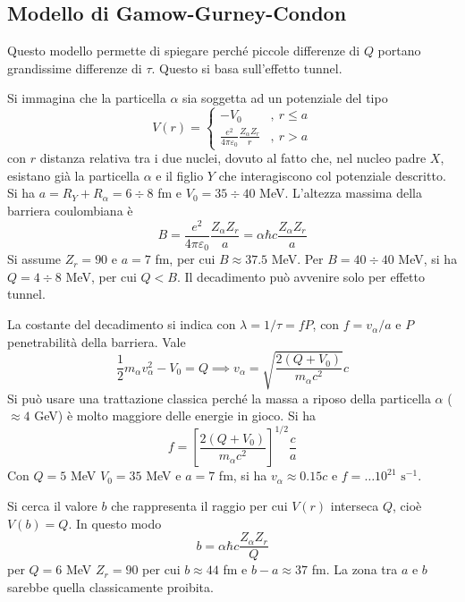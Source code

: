 \documentclass[11pt, a4paper]{scrartcl}
\theoremstyle{style}
\numberwithin{equation}{subsection}
\begin{document}
\subsection{Modello di Gamow-Gurney-Condon}
Questo modello permette di spiegare perch\'e piccole differenze di $Q$ portano grandissime differenze di $\tau $.
Questo si basa sull'effetto tunnel.

Si immagina che la particella $\alpha $ sia soggetta ad un potenziale del tipo 
\[
V(r) = \begin{cases}
	-V_0 &,\ r\le a\\
	\frac{e^2 }{4\pi \varepsilon _0} \frac{Z_\alpha Z_r}{r} &,\ r> a
\end{cases}
\] 
con $r$ distanza relativa tra i due nuclei, dovuto al fatto che, nel nucleo padre $X$, esistano gi\`a la particella $\alpha $ e il figlio $Y$ che interagiscono col potenziale descritto.
Si ha $a = R_Y + R_\alpha  = 6\div 8$ fm e $V_0 = 35\div 40$ MeV.
L'altezza massima della barriera coulombiana \`e 
\[
B = \frac{e^2}{4\pi \varepsilon _0} \frac{Z_\alpha  Z_r}{a} = \alpha \hbar c \frac{Z_\alpha Z_r}{a}
\] 
Si assume $Z_r = 90$ e $a = 7$ fm, per cui $B \approx 37.5$ MeV.
Per $B = 40 \div 40$ MeV, si ha $Q = 4 \div 8$ MeV, per cui $Q < B$.
Il decadimento pu\`o avvenire solo per effetto tunnel.

La costante del decadimento si indica con $\lambda  = 1 / \tau  = f P$, con $f = v_ \alpha  / a$ e $P$ penetrabilit\`a della barriera. 
Vale 
\[
\frac{1}{2} m_\alpha  v_\alpha ^2 - V_0 = Q \implies v_\alpha = \sqrt{\frac{2 (Q+V_0)}{m_\alpha c^2}} c
\] 
Si pu\`o usare una trattazione classica perch\'e la massa a riposo della particella $\alpha $ ($\approx 4$ GeV) \`e molto maggiore delle energie in gioco.
Si ha 
\[
f = \left[ \frac{2 (Q+V_0)}{m_\alpha c^2} \right] ^{1 / 2} \frac{c}{a}
\] 
Con $Q = 5$ MeV $V_0 = 35$ MeV e $a= 7$ fm, si ha $v_ \alpha  \approx 0.15 c$ e $f = \ldots 10^{21} \text{ s}^{-1}$.

Si cerca il valore $b$ che rappresenta il raggio per cui $V(r)$ interseca $Q$, cio\`e $V(b) = Q$.
In questo modo 
\[
b = \alpha  \hbar  c \frac{Z_\alpha  Z_r}{Q}
\] 
per $Q = 6$ MeV $Z_r= 90$ per cui $b\approx 44$ fm e $b-a \approx 37 $ fm.
La zona tra $a$ e $b$ sarebbe quella classicamente proibita.
\end{document}

